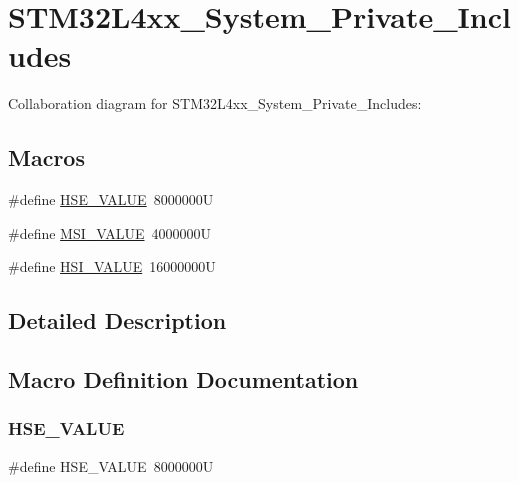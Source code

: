 \hypertarget{group__STM32L4xx__System__Private__Includes}{}\section{S\+T\+M32\+L4xx\+\_\+\+System\+\_\+\+Private\+\_\+\+Includes}
\label{group__STM32L4xx__System__Private__Includes}
Collaboration diagram for S\+T\+M32\+L4xx\+\_\+\+System\+\_\+\+Private\+\_\+\+Includes\+:
\subsection*{Macros}
\begin{DoxyCompactItemize}
\item 
\#define \hyperlink{group__STM32L4xx__System__Private__Includes_gaeafcff4f57440c60e64812dddd13e7cb}{H\+S\+E\+\_\+\+V\+A\+L\+UE}~8000000U
\item 
\#define \hyperlink{group__STM32L4xx__System__Private__Includes_ga90e2a73d7fe4a7425c6e31fef5ce7263}{M\+S\+I\+\_\+\+V\+A\+L\+UE}~4000000U
\item 
\#define \hyperlink{group__STM32L4xx__System__Private__Includes_gaaa8c76e274d0f6dd2cefb5d0b17fbc37}{H\+S\+I\+\_\+\+V\+A\+L\+UE}~16000000U
\end{DoxyCompactItemize}


\subsection{Detailed Description}


\subsection{Macro Definition Documentation}
\mbox{\label{group__STM32L4xx__System__Private__Includes_gaeafcff4f57440c60e64812dddd13e7cb}} 
\subsubsection{\texorpdfstring{H\+S\+E\+\_\+\+V\+A\+L\+UE}{HSE\_VALUE}}
{\footnotesize\ttfamily \#define H\+S\+E\+\_\+\+V\+A\+L\+UE~8000000U}

